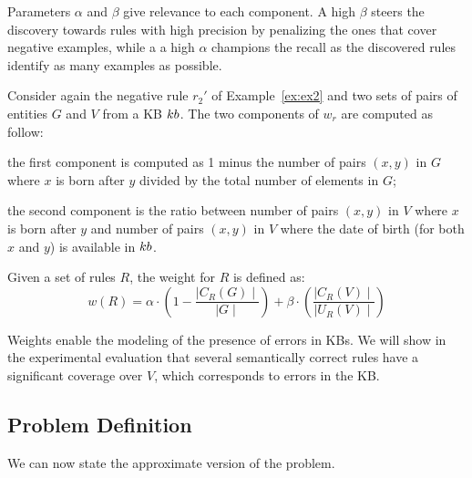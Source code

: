 Parameters $\alpha$ and $\beta$ give relevance to each component. A high $\beta$ steers the discovery towards rules with high precision by penalizing the ones that cover negative examples, %
while a a high $\alpha$ champions the recall as the discovered rules identify as many examples as possible.

\begin{example}
	Consider again the negative rule $r_2'$ of Example~\ref{ex:ex2} and two sets of pairs of entities $G$ and $V$ from a KB ${\sc kb}$. The two components of $w_r$ are computed as follow:
	\begin{inparaenum}[\itshape1)]
		\item the first component is computed as 1 minus the number of pairs $(x,y)$ in $G$ where
		$x$ is born after $y$ divided by the total number of elements in $G$;
		\item the second component is the ratio between number of pairs $(x,y)$ in $V$ where $x$ is born after $y$ and number of pairs $(x,y)$ in $V$ where the date of birth (for both $x$ and $y$) is available in ${\sc kb}$.
	\end{inparaenum}
\end{example}

\begin{definition}
	Given a set of rules $R$, the weight for $R$ is defined as:
	\begin{equation*}
		w(R) = \alpha \cdot (1-\frac{\mid C_{R}(G)\mid}{\mid G \mid}) +\beta \cdot (\frac{\mid C_{R}(V) \mid}{\mid U_{R}(V)\mid})
	\end{equation*}
\end{definition}

Weights enable the modeling  of the presence of errors in KBs. We will show in the experimental evaluation that several semantically correct rules have a significant coverage over $V$, which corresponds to errors in the KB. 


\subsection{Problem Definition} \label{sec:krd_prob_def}
We can now state the approximate version of the problem.


